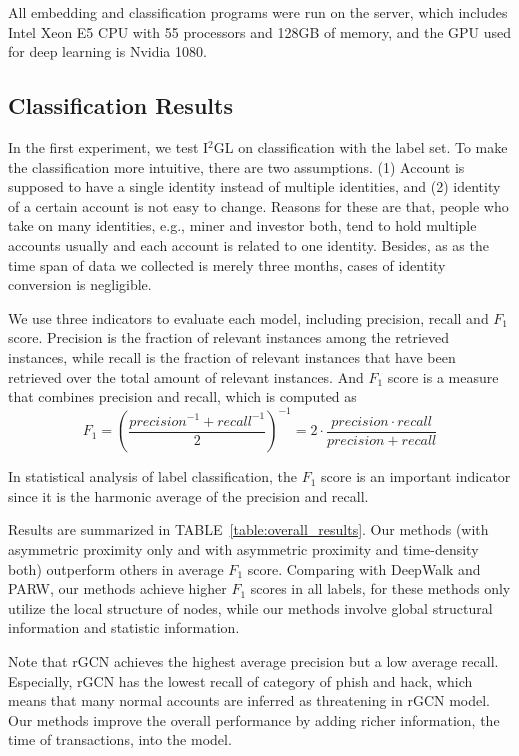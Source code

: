 All embedding and classification programs were run on the server, which includes Intel Xeon E5 CPU with 55 processors and 128GB of memory, and the GPU used for deep learning is Nvidia 1080.

\subsection{Classification Results}
In the first experiment, we test I$^2$GL on classification with the label set. To make the classification more intuitive, there are two assumptions. (1) Account is supposed to have a single identity instead of multiple identities, and (2) identity of a certain account is not easy to change. Reasons for these are that, people who take on many identities, e.g., miner and investor both, tend to hold multiple accounts usually and each account is related to one identity. Besides, as as the time span of data we collected is merely three months, cases of identity conversion is negligible.

We use three indicators to evaluate each model, including precision, recall and $F_1$ score. Precision is the fraction of relevant instances among the retrieved instances, while recall is the fraction of relevant instances that have been retrieved over the total amount of relevant instances. And $F_1$ score is a measure that combines precision and recall, which is computed as
\begin{equation}
F_1=(\frac{{precision}^{-1}+{recall}^{-1}}{2})^{-1}=2\cdot\frac{precision \cdot recall}{precision + recall}
\end{equation}

In statistical analysis of label classification, the $F_1$ score is an important indicator since it is the harmonic average of the precision and recall.

Results are summarized in TABLE~\ref{table:overall_results}. Our methods (with asymmetric proximity only and with asymmetric proximity and time-density both) outperform others in average $F_1$ score. Comparing with DeepWalk and PARW, our methods achieve higher $F_1$ scores in all labels, for these methods only utilize the local structure of nodes, while our methods involve global structural information and statistic information.

Note that rGCN achieves the highest average precision but a low average recall. Especially, rGCN has the lowest recall of category of phish and hack, which means that many normal accounts are inferred as threatening in rGCN model. Our methods improve the overall performance by adding richer information, the time of transactions, into the model.

